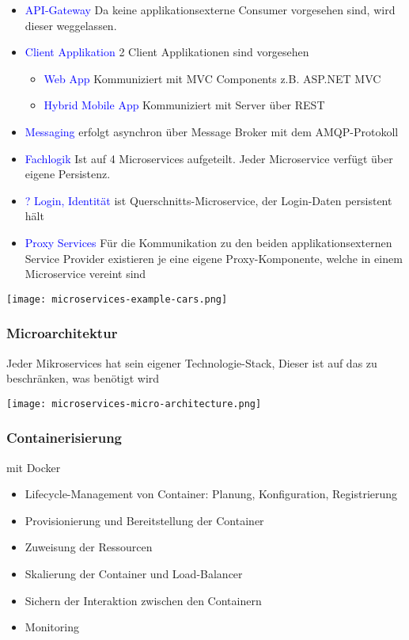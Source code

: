 \begin{itemize}
    \item \textcolor{blue}{API-Gateway} Da keine applikationsexterne Consumer vorgesehen sind, wird dieser weggelassen.
    \item \textcolor{blue}{Client Applikation} 2 Client Applikationen sind vorgesehen
    \begin{itemize}
        \item \textcolor{blue}{Web App} Kommuniziert mit MVC Components z.B. ASP.NET MVC
        \item \textcolor{blue}{Hybrid Mobile App} Kommuniziert mit Server über REST
    \end{itemize}
    \item \textcolor{blue}{Messaging} erfolgt asynchron über Message Broker mit dem AMQP-Protokoll
    \item \textcolor{blue}{Fachlogik} Ist auf 4 Microservices aufgeteilt. Jeder Microservice verfügt über eigene Persistenz.
    \item \textcolor{blue}{? Login, Identität} ist Querschnitts-Microservice, der Login-Daten persistent hält
    \item \textcolor{blue}{Proxy Services} Für die Kommunikation zu den beiden applikationsexternen Service Provider existieren je eine eigene Proxy-Komponente, welche in einem Microservice vereint sind
\end{itemize}
\vspace{10pt}
\texttt{[image: microservices-example-cars.png]}

\subsubsection{Microarchitektur}

Jeder Mikroservices hat sein eigener Technologie-Stack, Dieser ist auf das zu beschränken, was benötigt wird

\texttt{[image: microservices-micro-architecture.png]}

\subsubsection{Containerisierung}

mit Docker

\begin{itemize}
    \item Lifecycle-Management von Container: Planung, Konfiguration, Registrierung
    \item Provisionierung und Bereitstellung der Container
    \item Zuweisung der Ressourcen
    \item Skalierung der Container und Load-Balancer
    \item Sichern der Interaktion zwischen den Containern
    \item Monitoring
\end{itemize}

